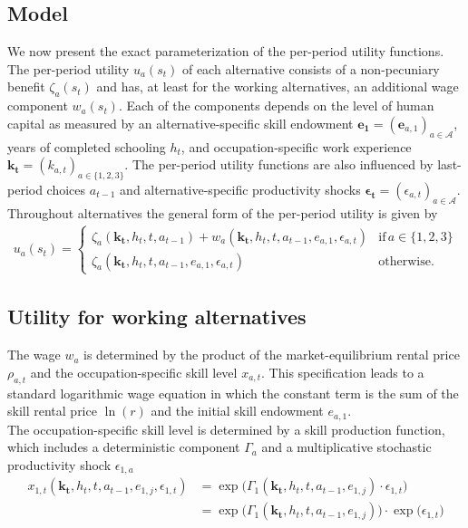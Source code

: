 \subsection{Model}\label{Appendix model}
We now present the exact parameterization of the per-period utility functions. The per-period utility $u_a(s_t)$ of each alternative consists of a non-pecuniary benefit $\zeta_a(s_t)$ and has, at least for the working alternatives, an additional wage component $w_a(s_t)$. Each of the components depends on the level of human capital as measured by an alternative-specific skill endowment $\bm{e_1} = \left(\bm{e}_{a,1}\right)_{a\in\mathcal{A}}$, years of completed schooling $h_t$, and occupation-specific work experience $\bm{k_t} = \left(k_{a,t}\right)_{a\in\{1, 2, 3\}}$. The per-period utility functions are also influenced by last-period choices $a_{t -1}$ and alternative-specific productivity shocks $\bm{\epsilon_t} = \left(\epsilon_{a,t}\right)_{a\in\mathcal{A}}$. Throughout alternatives the general form of the per-period utility is given by
\begin{align*}
u_a(s_t) =
\begin{cases}
    \zeta_a(\bm{k_t}, h_t, t, a_{t -1})  + w_a(\bm{k_t}, h_t, t, a_{t -1}, e_{a,1}, \epsilon_{a,t})              & \text{if}\, a \in \{1, 2, 3\}  \\
    \zeta_a(\bm{k_t}, h_t, t, a_{t-1}, e_{a,1}, \epsilon_{a,t})                                    & \text{otherwise.}
\end{cases}
\end{align*}

\subsection{Utility for working alternatives}
The wage $w_{a}$ is determined by the product of the market-equilibrium rental price $\rho_{a,t}$ and the occupation-specific skill level $x_{a,t}$. This specification leads to a standard logarithmic wage equation in which the constant term is the sum of the skill rental price $\ln(r)$ and the initial skill endowment $e_{a,1}$.\\

The occupation-specific skill level is determined by a skill production function, which includes a deterministic component $\Gamma_a$ and a multiplicative stochastic productivity shock $\epsilon_{1,a}$
%
\begin{align}\label{eq:WhiteCollarSkillLevel}
    x_{1,t}(\bm{k_t}, h_t, t, a_{t-1}, e_{1,j}, \epsilon_{1,t}) & = \exp \big( \Gamma_{1}(\bm{k_t},  h_t, t, a_{t-1}, e_{1,j}) \cdot \epsilon_{1,t} \big) \\\nonumber
                & = \exp \big( \Gamma_1(\bm{k_t},  h_t, t, a_{t-1}, e_{1,j}) \big) \cdot \exp \big( \epsilon_{1,t} \big)
\end{align}
